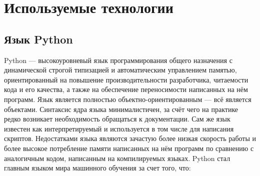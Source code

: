 \lstset{style=fsharpstyle}

\section{Используемые технологии} 
\label{sec:practice:technology_used}

\subsection{Язык Python}

Python — высокоуровневый язык программирования общего назначения с динамической строгой типизацией и автоматическим управлением памятью, ориентированный на повышение производительности разработчика, читаемости кода и его качества, а также на обеспечение переносимости написанных на нём программ. Язык является полностью объектно-ориентированным — всё является объектами. Синтаксис ядра языка минималистичен, за счёт чего на практике редко возникает необходимость обращаться к документации. Сам же язык известен как интерпретируемый и используется в том числе для написания скриптов. Недостатками языка являются зачастую более низкая скорость работы и более высокое потребление памяти написанных на нём программ по сравнению с аналогичным кодом, написанным на компилируемых языках. 
Python стал главным языком мира машинного обучения за счет того, что:

